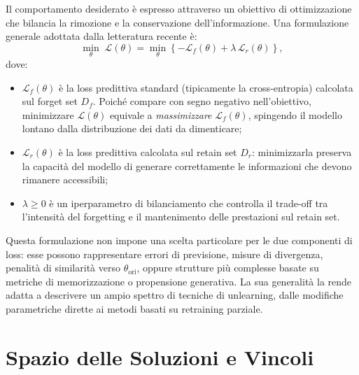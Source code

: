Il comportamento desiderato è espresso attraverso un obiettivo di ottimizzazione che bilancia la rimozione e la conservazione dell'informazione. Una formulazione generale adottata dalla letteratura recente è:
\begin{equation}
\min_{\theta} \; \mathcal{L}(\theta)
    = \min_{\theta} \left\{
        - \mathcal{L}_f(\theta) + \lambda \, \mathcal{L}_r(\theta)
    \right\},
\label{eq:unlearning_objective}
\end{equation}
dove:
\begin{itemize}
    \item $\mathcal{L}_f(\theta)$ è la loss predittiva standard (tipicamente la cross-entropia) calcolata sul forget set $D_f$. Poiché compare con segno negativo nell'obiettivo, minimizzare $\mathcal{L}(\theta)$ equivale a \emph{massimizzare} $\mathcal{L}_f(\theta)$, spingendo il modello lontano dalla distribuzione dei dati da dimenticare;
    \item $\mathcal{L}_r(\theta)$ è la loss predittiva calcolata sul retain set $D_r$: minimizzarla preserva la capacità del modello di generare correttamente le informazioni che devono rimanere accessibili;
    \item $\lambda \geq 0$ è un iperparametro di bilanciamento che controlla il trade-off tra l'intensità del forgetting e il mantenimento delle prestazioni sul retain set.
\end{itemize}

Questa formulazione non impone una scelta particolare per le due componenti di loss: esse possono rappresentare errori di previsione, misure di divergenza, penalità di similarità verso $\theta_{\mathrm{ori}}$, oppure strutture più complesse basate su metriche di memorizzazione o propensione generativa. La sua generalità la rende adatta a descrivere un ampio spettro di tecniche di unlearning, dalle modifiche parametriche dirette ai metodi basati su retraining parziale.

\section{Spazio delle Soluzioni e Vincoli}

